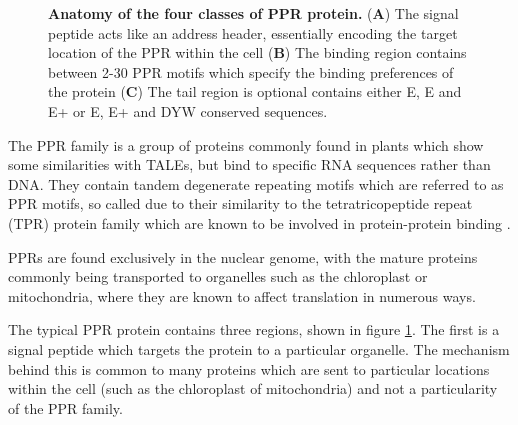 \begin{figure}
\begin{center}
  \end{center}
  \caption[LoF entry]{
    \textbf{Anatomy of the four classes of PPR protein.}
    (\textbf{A}) The signal peptide acts like an address header, essentially 
      encoding the target location of the PPR within the cell
    (\textbf{B}) The binding region contains between 2-30 PPR motifs which 
      specify the binding preferences of the protein
    (\textbf{C}) The tail region is optional contains either E, E and E+ or 
      E, E+ and DYW conserved sequences.
  }
  \label{fig:ppr_anatomy}
\end{figure}

The PPR family is a group of proteins commonly found in plants which show some
similarities with TALEs, but bind to specific RNA sequences rather than DNA.
They contain tandem degenerate repeating motifs which are referred to as PPR 
motifs, so called due to their similarity to the tetratricopeptide repeat (TPR) 
protein family which are known to be involved in protein-protein binding 
\citep{Small2000}.

PPRs are found exclusively in the nuclear genome, with the mature proteins
commonly being transported to
organelles such as the chloroplast or mitochondria, where they are known to
affect translation in numerous ways.

The typical PPR protein contains three regions, shown in figure
\ref{fig:ppr_anatomy}.
The first is a signal peptide which targets the protein to a particular 
organelle.
The mechanism behind this is common to many proteins which are sent to 
particular
locations within the cell (such as the chloroplast of mitochondria) and not a
particularity of the PPR family. 

